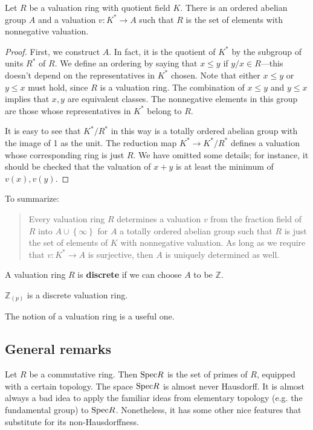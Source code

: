 \begin{proposition} 
Let $R$ be a valuation ring with quotient field $K$. There is an ordered
abelian group
$A$ and a valuation $v: K^* \to A$ such that $R$ is the set of elements with
nonnegative valuation.
\end{proposition} 
\begin{proof} 
First, we construct $A$. In fact, it is the quotient of $K^*$ by the subgroup
of units  $R^*$ of $R$.  
We define an ordering by saying that $x \leq y$ if $y/x \in R$---this doesn't
depend on the representatives in $K^*$ chosen.  Note that either $x \leq y$ or
$y \leq x$ must hold, since $R$ is a valuation ring. 
The combination of $ x \leq y$ and $y \leq x$ implies that $x,y$ are equivalent
classes.
The nonnegative elements in this group are those whose representatives in $K^*$
belong to $R$.

It is easy to see that $K^*/R^*$ in this way is a totally ordered abelian group with
the image of 1 as the unit. The
reduction map $K^* \to K^*/R^*$  defines a valuation whose corresponding ring
is just $R$. We have omitted some details; for instance, it should be checked
that the valuation of $x+y$ is at least the minimum of $v(x), v(y)$. 
\end{proof} 



To summarize:
\begin{quote}
Every valuation ring $R$ determines a valuation $v$ from the fraction field of
$R$ into $A \cup \left\{\infty\right\}$ for $A$ a totally ordered abelian group
such that $R$ is just the set of elements of $K$ with nonnegative valuation. As
long as we require that $v: K^* \to A$ is surjective, then $A$ is uniquely
determined as well.
\end{quote}

\begin{definition} 
A valuation ring $R$ is \textbf{discrete} if we can choose $A$ to be
$\mathbb{Z}$. 
\end{definition} 

\begin{example} 
$\mathbb{Z}_{(p)}$ is a discrete valuation ring.  
\end{example} 

The notion of a valuation ring is a useful one.

\subsection{General remarks}
Let $R$ be a commutative ring. Then $\mathrm{Spec} R$ is the set of primes of $R$, equipped
with a certain topology. The space $\mathrm{Spec} R$ is almost never Hausdorff. It is
almost always a bad idea to apply the familiar ideas from elementary topology
(e.g. the fundamental group) to $\mathrm{Spec} R$. Nonetheless, it has some other nice
features that substitute for its non-Hausdorffness.

